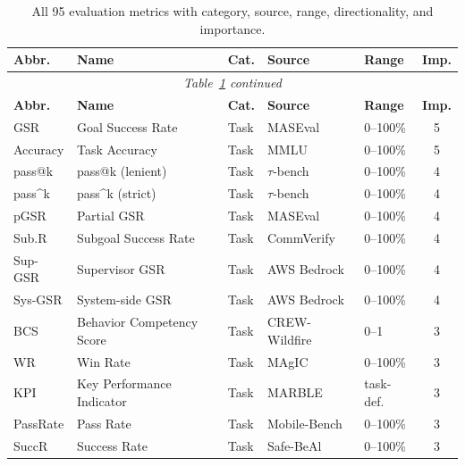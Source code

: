 \documentclass[11pt,a4paper]{article}
\begin{document}
\begin{longtable}{p{1.8cm}p{3.5cm}p{1.2cm}p{1.8cm}p{1.0cm}c}
  \caption{All 95 evaluation metrics with category, source, range, directionality, and importance.}
  \label{tab:full_metrics} \\
  \toprule
  \textbf{Abbr.} & \textbf{Name} & \textbf{Cat.} & \textbf{Source} & \textbf{Range} & \textbf{Imp.} \\
  \midrule
  \endfirsthead
  \multicolumn{6}{c}{\textit{Table~\ref{tab:full_metrics} continued}} \\
  \toprule
  \textbf{Abbr.} & \textbf{Name} & \textbf{Cat.} & \textbf{Source} & \textbf{Range} & \textbf{Imp.} \\
  \midrule
  \endhead
  \bottomrule
  \endlastfoot
  GSR            & Goal Success Rate              & Task    & MASEval           & 0--100\%   & 5 \\
  Accuracy       & Task Accuracy                  & Task    & MMLU              & 0--100\%   & 5 \\
  pass@k         & pass@k (lenient)               & Task    & $\tau$-bench      & 0--100\%   & 4 \\
  pass\^{}k      & pass\^{}k (strict)             & Task    & $\tau$-bench      & 0--100\%   & 4 \\
  pGSR           & Partial GSR                    & Task    & MASEval           & 0--100\%   & 4 \\
  Sub.R          & Subgoal Success Rate           & Task    & CommVerify        & 0--100\%   & 4 \\
  Sup-GSR        & Supervisor GSR                 & Task    & AWS Bedrock       & 0--100\%   & 4 \\
  Sys-GSR        & System-side GSR                & Task    & AWS Bedrock       & 0--100\%   & 4 \\
  BCS            & Behavior Competency Score      & Task    & CREW-Wildfire     & 0--1       & 3 \\
  WR             & Win Rate                       & Task    & MAgIC             & 0--100\%   & 3 \\
  KPI            & Key Performance Indicator      & Task    & MARBLE            & task-def.  & 3 \\
  PassRate       & Pass Rate                      & Task    & Mobile-Bench      & 0--100\%   & 3 \\
  SuccR          & Success Rate                   & Task    & Safe-BeAl         & 0--100\%   & 3 \\

\end{longtable}
\end{document}
